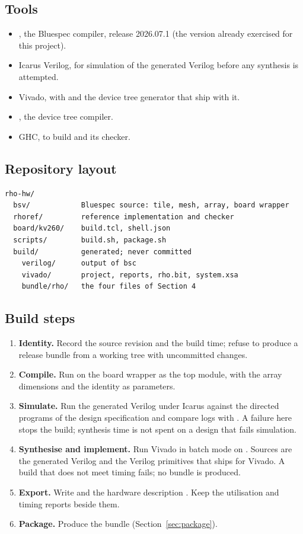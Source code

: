 \subsection{Tools}
\begin{itemize}
\item {}, the Bluespec compiler, release 2026.07.1 (the version
already exercised for this project).
\item Icarus Verilog, for simulation of the generated Verilog before any
synthesis is attempted.
\item Vivado, with  and the device tree generator that ship
with it.
\item {}, the device tree compiler.
\item GHC, to build  and its checker.
\end{itemize}

\subsection{Repository layout}
\begin{lstlisting}
rho-hw/
  bsv/            Bluespec source: tile, mesh, array, board wrapper
  rhoref/         reference implementation and checker
  board/kv260/    build.tcl, shell.json
  scripts/        build.sh, package.sh
  build/          generated; never committed
    verilog/      output of bsc
    vivado/       project, reports, rho.bit, system.xsa
    bundle/rho/   the four files of Section 4
\end{lstlisting}

\subsection{Build steps}\label{sec:steps}
\begin{enumerate}
\item \textbf{Identity.} Record the source revision and the build time; refuse
to produce a release bundle from a working tree with uncommitted changes.
\item \textbf{Compile.} Run  on the board wrapper as the
top module, with the array dimensions and the identity as parameters.
\item \textbf{Simulate.} Run the generated Verilog under Icarus against the
directed programs of the design specification and compare logs with
. A failure here stops the build; synthesis time is not spent on
a design that fails simulation.
\item \textbf{Synthesise and implement.} Run Vivado in batch mode on
. Sources are the generated Verilog and the Verilog primitives
that  ships for Vivado. A build that does not meet timing fails; no
bundle is produced.
\item \textbf{Export.} Write  and the hardware description
. Keep the utilisation and timing reports beside them.
\item \textbf{Package.} Produce the bundle (Section~\ref{sec:package}).
\end{enumerate}

